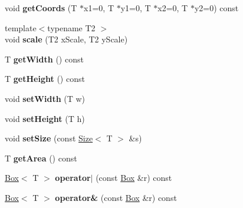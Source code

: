 \begin{DoxyCompactItemize}
\item 
\hypertarget{class_box_a08182031d00233aa02f6b9380d213c86}{
void {\bfseries getCoords} (T $\ast$x1=0, T $\ast$y1=0, T $\ast$x2=0, T $\ast$y2=0) const }
\label{class_box_a08182031d00233aa02f6b9380d213c86}

\item 
\hypertarget{class_box_a710290e5022b29be36491593d26e938d}{
{\footnotesize template$<$typename T2 $>$ }\\void {\bfseries scale} (T2 xScale, T2 yScale)}
\label{class_box_a710290e5022b29be36491593d26e938d}

\item 
\hypertarget{class_box_a25420c9b205a53b1345ff2dce6d2f351}{
T {\bfseries getWidth} () const }
\label{class_box_a25420c9b205a53b1345ff2dce6d2f351}

\item 
\hypertarget{class_box_a4658e043d83b5360bc186a73c1859313}{
T {\bfseries getHeight} () const }
\label{class_box_a4658e043d83b5360bc186a73c1859313}

\item 
\hypertarget{class_box_a7cfb90348077f6476e5f9aa7ff8d851d}{
void {\bfseries setWidth} (T w)}
\label{class_box_a7cfb90348077f6476e5f9aa7ff8d851d}

\item 
\hypertarget{class_box_a88efe31d53ff3895a3036e7f183152d7}{
void {\bfseries setHeight} (T h)}
\label{class_box_a88efe31d53ff3895a3036e7f183152d7}

\item 
\hypertarget{class_box_acd6d5e40c68328ff7a000574a306483b}{
void {\bfseries setSize} (const \hyperlink{class_size}{Size}$<$ T $>$ \&s)}
\label{class_box_acd6d5e40c68328ff7a000574a306483b}

\item 
\hypertarget{class_box_aa929e8c0b27bef9952ee0609eacf9181}{
T {\bfseries getArea} () const }
\label{class_box_aa929e8c0b27bef9952ee0609eacf9181}

\item 
\hypertarget{class_box_ad98b489652ab9b1e98171bc07c3526b0}{
\hyperlink{class_box}{Box}$<$ T $>$ {\bfseries operator$|$} (const \hyperlink{class_box}{Box} \&r) const }
\label{class_box_ad98b489652ab9b1e98171bc07c3526b0}

\item 
\hypertarget{class_box_a4e303bf9c573dba8cfe7b6f699741040}{
\hyperlink{class_box}{Box}$<$ T $>$ {\bfseries operator\&} (const \hyperlink{class_box}{Box} \&r) const }
\label{class_box_a4e303bf9c573dba8cfe7b6f699741040}


\end{DoxyCompactItemize}
